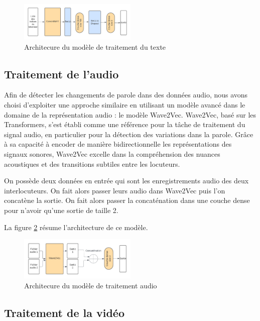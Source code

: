 \documentclass[a4paper]{article}
\begin{document}
\begin{figure}[H]
    \centering
    \includegraphics[width=0.5\textwidth]{Traitement_texte_SAM.png}
    \caption{Architecure du modèle de traitement du texte}
    \label{fig: model_text}
\end{figure}

\subsection{Traitement de l'audio}

\cite{DBLP:journals/corr/abs-2006-11477}
Afin de détecter les changements de parole dans des données audio, nous avons choisi d'exploiter une approche similaire en utilisant un modèle avancé dans le domaine de la représentation audio : le modèle Wave2Vec. Wave2Vec, basé sur les Transformers, s'est établi comme une référence pour la tâche de traitement du signal audio, en particulier pour la détection des variations dans la parole. Grâce à sa capacité à encoder de manière bidirectionnelle les représentations des signaux sonores, Wave2Vec excelle dans la compréhension des nuances acoustiques et des transitions subtiles entre les locuteurs. 

On possède deux données en entrée qui sont les enregistrements audio des deux interlocuteurs. On fait alors passer leurs audio dans Wave2Vec puis l'on concatène la sortie. On fait alors passer la concaténation dans une couche dense pour n'avoir qu'une sortie de taille 2.

La figure \ref{fig: model_audio} résume l'architecture de ce modèle.

\begin{figure}[H]
    \centering
    \includegraphics[width=0.5\textwidth]{Traitement_audio_SAM.png}
    \caption{Architecure du modèle de traitement audio}
    \label{fig: model_audio}
\end{figure}

\subsection{Traitement de la vidéo}
\end{document}
